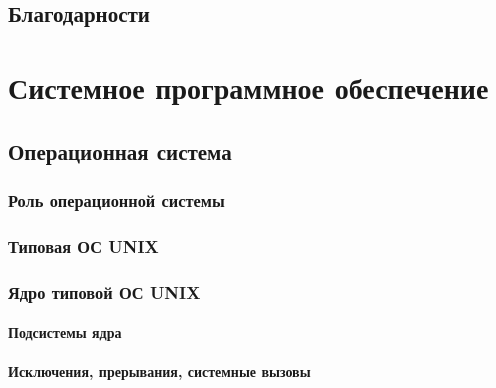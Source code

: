 \documentclass[oneside]{book}
\begin{document}
\cleardoublepage\clearpage




\clearpage

\tableofcontents

\clearpage 
{}
\chapter*{Благодарности}



\clearpage \part{Системное программное обеспечение}
%

   \chapter{Операционная система}

      \section{Роль операционной системы}
      

      \section{Типовая ОС UNIX}
      

      \section{Ядро типовой ОС UNIX}
      

         \subsection{Подсистемы ядра}
         

         \subsection{Исключения, прерывания, системные вызовы}
\end{document}
